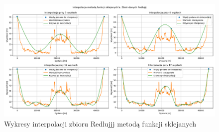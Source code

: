 \documentclass{article} %
\begin{document}
\begin{figure}[H]
    \centering
    \includegraphics[scale=0.47]{../plots/splines_Redlujjj.png}
    \caption{Wykresy interpolacji zbioru Redlujjj metodą funkcji sklejanych}
\end{figure}
\end{document}
